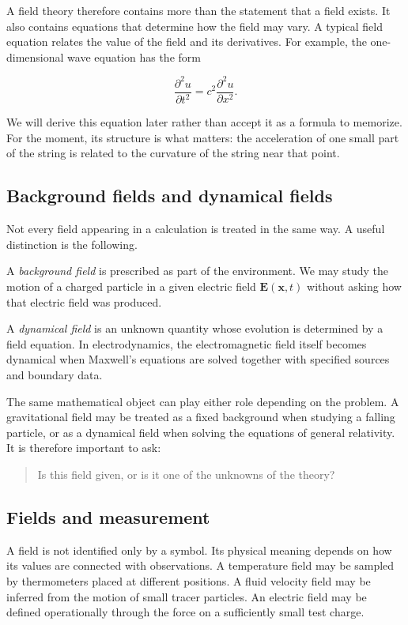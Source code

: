 A field theory therefore contains more than the statement that a field exists. It also contains equations that determine how the field may vary. A typical field equation relates the value of the field and its derivatives. For example, the one-dimensional wave equation has the form

\[
\frac{\partial^{2}u}{\partial t^{2}}
=
c^{2}
\frac{\partial^{2}u}{\partial x^{2}}.
\]

We will derive this equation later rather than accept it as a formula to memorize. For the moment, its structure is what matters: the acceleration of one small part of the string is related to the curvature of the string near that point.

\subsection{Background fields and dynamical fields}

Not every field appearing in a calculation is treated in the same way. A useful distinction is the following.

A \emph{background field} is prescribed as part of the environment. We may study the motion of a charged particle in a given electric field \(\mathbf{E}(\mathbf{x},t)\) without asking how that electric field was produced.

A \emph{dynamical field} is an unknown quantity whose evolution is determined by a field equation. In electrodynamics, the electromagnetic field itself becomes dynamical when Maxwell's equations are solved together with specified sources and boundary data.

The same mathematical object can play either role depending on the problem. A gravitational field may be treated as a fixed background when studying a falling particle, or as a dynamical field when solving the equations of general relativity. It is therefore important to ask:

\begin{quote}
Is this field given, or is it one of the unknowns of the theory?
\end{quote}

\subsection{Fields and measurement}

A field is not identified only by a symbol. Its physical meaning depends on how its values are connected with observations. A temperature field may be sampled by thermometers placed at different positions. A fluid velocity field may be inferred from the motion of small tracer particles. An electric field may be defined operationally through the force on a sufficiently small test charge.

